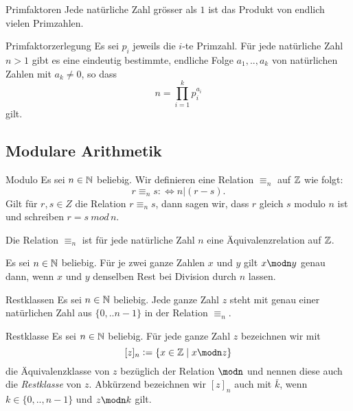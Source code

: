 \begin{theorem}{Primfaktoren}
    Jede natürliche Zahl grösser als $1$ ist das Produkt von endlich vielen Primzahlen.
\end{theorem}

\begin{theorem}{Primfaktorzerlegung}
    Es sei $p_i$ jeweils die $i$-te Primzahl. Für jede natürliche Zahl $n>1$ gibt es eine eindeutig bestimmte, endliche Folge $a_1,..,a_k$ von natürlichen Zahlen mit $a_k\neq 0$, so dass
    \[
        n=\prod_{i=1}^k p_i^{a_i}
    \]
    gilt.
\end{theorem}

\subsection{Modulare Arithmetik}

\begin{definition}{Modulo}
    Es sei $n\in\mathbb{N}$ beliebig. Wir definieren eine Relation $\equiv_n$ auf $\mathbb{Z}$ wie folgt:
    \[
        r\equiv_n s:\Leftrightarrow n|(r-s).
    \]
    Gilt für $r,s\in Z$ die Relation $r\equiv_ns$, dann sagen wir, dass $r$ gleich $s$ modulo $n$ ist und schreiben $r=s \:mod\, n$.
\end{definition}

\begin{remark}
    Die Relation $\equiv_n$ ist für jede natürliche Zahl $n$ eine Äquivalenzrelation auf $\mathbb{Z}$.
\end{remark}

\begin{remark}
    Es sei $n\in\mathbb{N}$ beliebig. Für je zwei ganze Zahlen $x$ und $y$ gilt $x\modn y$ genau dann, wenn $x$ und $y$ denselben Rest bei Division durch $n$ lassen.
\end{remark}

\begin{corollary}{Restklassen}
    Es sei $n\in\mathbb{N}$ beliebig. Jede ganze Zahl $z$ steht mit genau einer natürlichen Zahl aus $\{0,..n-1\}$ in der Relation $\equiv_n$.
\end{corollary}

\begin{definition}{Restklasse}
    Es sei $n\in\mathbb{N}$ beliebig. Für jede ganze Zahl $z$ bezeichnen wir mit
    \[
        [z]_n:=\{x\in\Z\mid x\modn z\}
    \]
    die Äquivalenzklasse von $z$ bezüglich der Relation $\modn$ und nennen diese auch die \textit{Restklasse} von $z$. Abkürzend bezeichnen wir $[z]_n$ auch mit $\bar k$, wenn $k\in\{0,..,n-1\}$ und $z\modn k$ gilt.
\end{definition}

